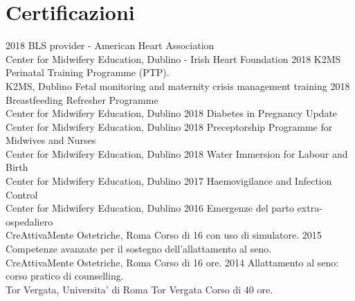 \documentclass[11pt]{friggeri-cv}
\begin{document}
\section{Certificazioni}
\begin{entrylist}
  \entry
    {2018}
    {BLS provider - American Heart Association}
    {\\Center for Midwifery Education, Dublino - Irish Heart Foundation}
    {\vspace{-10pt}}
  \entry
    {2018}
    {K2MS Perinatal Training Programme (PTP).}
    {\\K2MS, Dublino}
    {Fetal monitoring and maternity crisis management training}
  \entry
    {2018}
    {Breastfeeding Refresher Programme}
    {\\Center for Midwifery Education, Dublino}
    {\vspace{-10pt}}
  \entry
    {2018}
    {Diabetes in Pregnancy Update}
    {\\Center for Midwifery Education, Dublino}
    {\vspace{-10pt}}
  \entry
    {2018}
    {Preceptorship Programme for Midwives and Nurses}
    {\\Center for Midwifery Education, Dublino}
    {\vspace{-10pt}}
  \entry
    {2018}
    {Water Immersion for Labour and Birth}
    {\\Center for Midwifery Education, Dublino}
    {\vspace{-10pt}}
  \entry
    {2017}
    {Haemovigilance and Infection Control}
    {\\Center for Midwifery Education, Dublino}
    {\vspace{-10pt}}
  \entry
    {2016}
    {Emergenze del parto extra-ospedaliero}
    {\\CreAttivaMente Ostetriche, Roma}
    {Corso di 16 con uso di simulatore.}
  \entry
    {2015}
    {Competenze avanzate per il sostegno dell’allattamento al seno.}
    {\\CreAttivaMente Ostetriche, Roma }
    {Corso di 16 ore.}
  \entry
    {2014}
    {Allattamento al seno: corso pratico di counselling.}
    {\\Tor Vergata, Universita' di Roma Tor Vergata}
    {Corso di 40 ore.}
\end{entrylist}

\vspace{-10pt}
\end{document}
